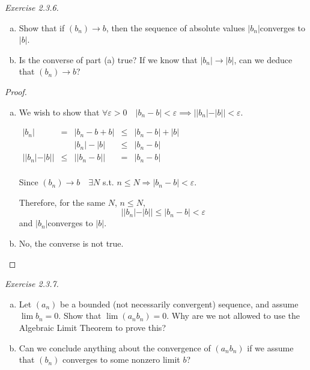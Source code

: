 \documentclass{tufte-book}
\theoremstyle{definition}
\numberwithin{section}{chapter}
\begin{document}
\smallskip


\noindent
\emph{Exercise 2.3.6.} 
\begin{enumerate}[(a)]
\item Show that if $(b_n) \to b$, then the sequence of absolute values $|b_n| $converges to $|b|$.


\item Is the converse of part (a) true? If we know that $|b_n| \to |b|$, can we deduce that $(b_n) \to b$?
\end{enumerate}

\begin{proof}
\begin{enumerate}[(a)]
\item We wish to show that $\forall \varepsilon > 0 \quad |b_n - b| < \varepsilon  \implies ||b_n| - |b|| < \varepsilon$.

$\begin{array} {rcrcl} 
|b_n|& = &|b_n - b + b|  &\leq & |b_n - b| + |b|\\ 
	&&	|b_n| - |b|	& \leq & |b_n - b|	\\
||b_n| - |b|| &\leq&    ||b_n - b|| &=& |b_n - b|\\
    \end{array}	$
    
    Since $(b_n) \to b  \quad \exists N$ s.t. $n \leq N \Rightarrow |b_n - b| < \varepsilon$.
    
    Therefore, for the same $N$, $n \leq N$,
    $$ ||b_n| - |b|| \leq     |b_n - b| < \varepsilon $$
    and $|b_n| $converges to $|b|$.
    
\item No, the converse is not true.
\end{enumerate}
\end{proof}

\smallskip


\noindent
\emph{Exercise 2.3.7.} 
\begin{enumerate}[(a)]
	\item Let $(a_n)$ be a bounded (not necessarily convergent) sequence, and assume $\lim b_n = 0$. Show that $\lim(a_n b_n ) = 0$. Why are we not allowed to use the Algebraic Limit Theorem to prove this?

\item Can we conclude anything about the convergence of $(a_n b_n)$ if we assume that $(b_n)$ converges to some nonzero limit $b$?
\end{enumerate}
\end{document}
